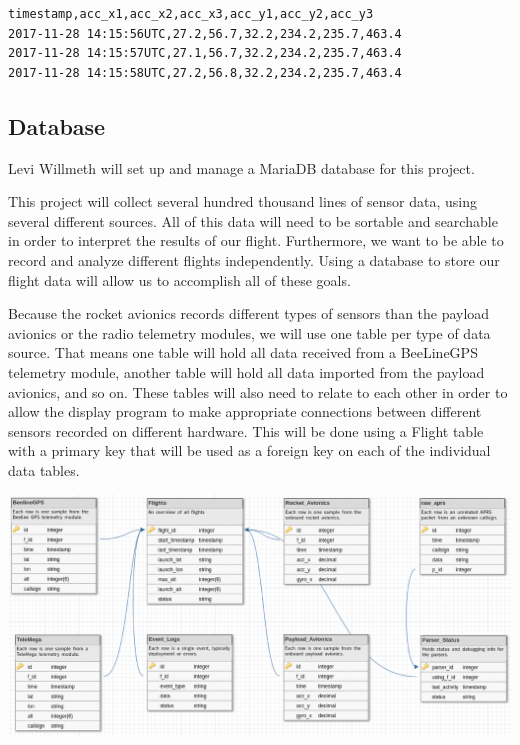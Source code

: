 \documentclass[onecolumn, draftclsnofoot, 10pt, compsoc]{IEEEtran}
\begin{document}
\begin{lstlisting}[frame=single]
timestamp,acc_x1,acc_x2,acc_x3,acc_y1,acc_y2,acc_y3
2017-11-28 14:15:56UTC,27.2,56.7,32.2,234.2,235.7,463.4
2017-11-28 14:15:57UTC,27.1,56.7,32.2,234.2,235.7,463.4
2017-11-28 14:15:58UTC,27.2,56.8,32.2,234.2,235.7,463.4
\end{lstlisting}
\label{example-file}


\subsection{Database}
\label{subsec:database}

Levi Willmeth will set up and manage a MariaDB database for this project.

This project will collect several hundred thousand lines of sensor data, using several different sources.  All of this data will need to be sortable and searchable in order to interpret the results of our flight.  Furthermore, we want to be able to record and analyze different flights independently.  Using a database to store our flight data will allow us to accomplish all of these goals.

Because the rocket avionics records different types of sensors than the payload avionics or the radio telemetry modules, we will use one table per type of data source.  That means one table will hold all data received from a BeeLineGPS telemetry module, another table will hold all data imported from the payload avionics, and so on.  These tables will also need to relate to each other in order to allow the display program to make appropriate connections between different sensors recorded on different hardware.  This will be done using a Flight table with a primary key that will be used as a foreign key on each of the individual data tables.

\begin{center}
	\includegraphics[width=\textwidth]{images/database_schema_v102.eps}
    \label{database-schema}
\end{center}
\end{document}
